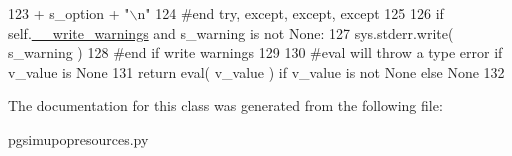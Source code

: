 \begin{DoxyCode}
123                     + s\_option + \textcolor{stringliteral}{"\(\backslash\)n"} 
124         \textcolor{comment}{#end try, except, except, except}
125 
126         \textcolor{keywordflow}{if} self.\hyperlink{classnegui_1_1pgsimupopresources_1_1PGSimuPopResources_ae4805ab6ba55817bc2e40fd622d76483}{\_\_write\_warnings} \textcolor{keywordflow}{and} s\_warning \textcolor{keywordflow}{is} \textcolor{keywordflow}{not} \textcolor{keywordtype}{None}:
127             sys.stderr.write( s\_warning )
128         \textcolor{comment}{#end if write warnings }
129 
130         \textcolor{comment}{#eval will throw a type error if v\_value is None}
131         \textcolor{keywordflow}{return} eval( v\_value ) \textcolor{keywordflow}{if} v\_value \textcolor{keywordflow}{is} \textcolor{keywordflow}{not} \textcolor{keywordtype}{None} \textcolor{keywordflow}{else} \textcolor{keywordtype}{None}
132 
\end{DoxyCode}


The documentation for this class was generated from the following file\+:\begin{DoxyCompactItemize}
\item 
pgsimupopresources.\+py\end{DoxyCompactItemize}
